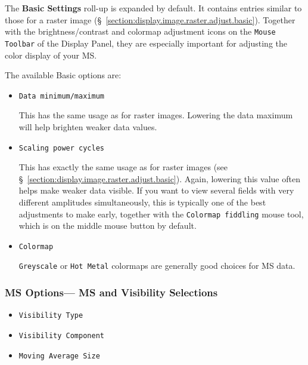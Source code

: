 The {\bf Basic Settings} roll-up is expanded by
default.  It contains entries similar to
those for a raster image (\S~\ref{section:display.image.raster.adjust.basic}). 
Together with the brightness/contrast and colormap adjustment icons
on the {\tt Mouse Toolbar} of the Display Panel, they are especially
important for adjusting the color display of your MS.

The available Basic options are:

\begin{itemize}

\item {\tt Data minimum/maximum}

This has the same usage as for raster images.  
Lowering the data maximum will help brighten
weaker data values.

\item {\tt Scaling power cycles}

This has exactly the same usage as for raster images (see
\S~\ref{section:display.image.raster.adjust.basic}).  Again, lowering
this value often helps make weaker data visible.  If you want to view
several fields with very different amplitudes simultaneously, this is
typically one of the best adjustments to make early, together with the
{\tt Colormap fiddling} mouse tool, which is on the middle mouse button
by default.

\item {\tt Colormap}

{\tt Greyscale} or {\tt Hot Metal} colormaps are generally good choices
for MS data.

\end{itemize}



\subsubsection{MS Options--- MS and Visibility Selections}
\label{section:display.ms.adjust.select}

\begin{itemize}

\item {\tt Visibility Type}

\item {\tt Visibility Component}

\item {\tt Moving Average Size}

\end{itemize}

